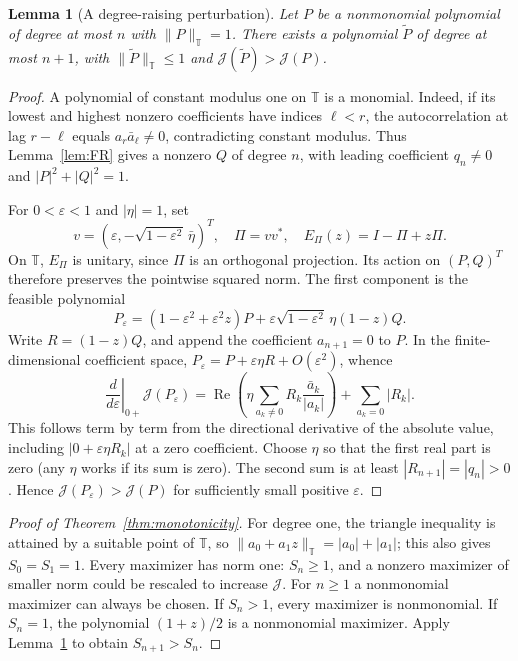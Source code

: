 \documentclass[11pt]{article}
\newtheorem{lemma}[theorem]{Lemma}
\newcommand{\T}{\mathbb T}
\newcommand{\J}{\mathcal J}
\DeclareMathOperator{\Rea}{Re}
\begin{document}
\begin{lemma}[A degree-raising perturbation]\label{lem:degree-raise}
Let $P$ be a nonmonomial polynomial of degree at most $n$ with
$\|P\|_\T=1$. There exists a polynomial $\widetilde P$ of degree at
most $n+1$, with $\|\widetilde P\|_\T\le1$ and
$\J(\widetilde P)>\J(P)$.
\end{lemma}
\begin{proof}
A polynomial of constant modulus one on $\T$ is a monomial. Indeed, if
its lowest and highest nonzero coefficients have indices $\ell<r$, the
autocorrelation at lag $r-\ell$ equals $a_r\bar a_\ell\ne0$, contradicting
constant modulus. Thus Lemma~\ref{lem:FR} gives a nonzero $Q$ of degree
$n$, with leading coefficient $q_n\ne0$ and $|P|^2+|Q|^2=1$.

For $0<\varepsilon<1$ and $|\eta|=1$, set
\[
 v=(\varepsilon,-\sqrt{1-\varepsilon^2}\,\bar\eta)^T,
 \quad\Pi=vv^*,\quad E_\Pi(z)=I-\Pi+z\Pi.
\]
On $\T$, $E_\Pi$ is unitary, since $\Pi$ is an orthogonal projection.
Its action on $(P,Q)^T$ therefore preserves the pointwise squared norm.
The first component is the feasible polynomial
\begin{equation}\label{eq:raiseperturb}
 P_\varepsilon=(1-\varepsilon^2+\varepsilon^2z)P+
 \varepsilon\sqrt{1-\varepsilon^2}\,\eta(1-z)Q.
\end{equation}
Write $R=(1-z)Q$, and append the coefficient $a_{n+1}=0$ to $P$.
In the finite-dimensional coefficient space,
$P_\varepsilon=P+\varepsilon\eta R+O(\varepsilon^2)$, whence
\begin{equation}\label{eq:l1direction}
 \left.\frac{d}{d\varepsilon}\right|_{0+}\J(P_\varepsilon)=
 \Rea\left(\eta\sum_{a_k\ne0}
                R_k\frac{\bar a_k}{|a_k|}\right)
       +\sum_{a_k=0}|R_k|.
\end{equation}
This follows term by term from the directional derivative of the absolute
value, including $|0+\varepsilon\eta R_k|$ at a zero coefficient.
Choose $\eta$ so that the first real part is zero (any $\eta$ works if
its sum is zero). The second sum is at least
$|R_{n+1}|=|q_n|>0$. Hence $\J(P_\varepsilon)>\J(P)$ for sufficiently
small positive $\varepsilon$.
\end{proof}

\begin{proof}[Proof of Theorem~\ref{thm:monotonicity}]
For degree one, the triangle inequality is attained by a suitable point
of $\T$, so $\|a_0+a_1z\|_\T=|a_0|+|a_1|$; this also gives $S_0=S_1=1$.
Every maximizer has norm one: $S_n\ge1$, and a nonzero maximizer of
smaller norm could be rescaled to increase $\J$. For $n\ge1$ a
nonmonomial maximizer can always be chosen. If $S_n>1$,
every maximizer is nonmonomial. If $S_n=1$, the polynomial $(1+z)/2$
is a nonmonomial maximizer. Apply Lemma~\ref{lem:degree-raise} to obtain
$S_{n+1}>S_n$.
\end{proof}
\end{document}
